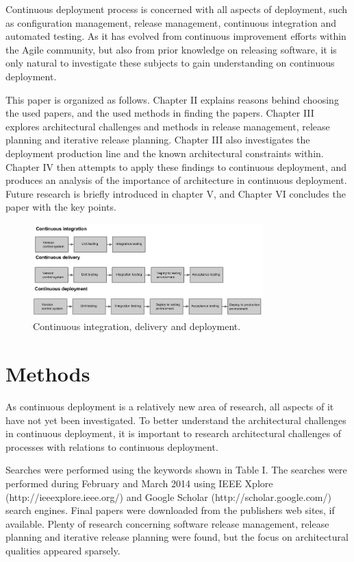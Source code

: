 \documentclass[conference]{IEEEtran}
\begin{document}
Continuous deployment process is concerned with all aspects of deployment, such as configuration management, release management, continuous integration and automated testing. As it has evolved from continuous improvement efforts within the Agile community, but also from prior knowledge on releasing software, it is only natural to investigate these subjects to gain understanding on continuous deployment.

This paper is organized as follows. Chapter II explains reasons behind choosing the used papers, and the used methods in finding the papers. Chapter III explores architectural challenges and methods in release management, release planning and iterative release planning. Chapter III also investigates the deployment production line and the known architectural constraints within. Chapter IV then attempts to apply these findings to continuous deployment, and produces an analysis of the importance of architecture in continuous deployment. Future research is briefly introduced in chapter V, and Chapter VI concludes the paper with the key points.  

\begin{figure}[!t]
	\centering
	\includegraphics[width=3.5in]{rtvd.jpg}
	\caption{Continuous integration, delivery and deployment.}
	\label{fig1}
\end{figure}

\section{Methods} %

As continuous deployment is a relatively new area of research, all aspects of it have not yet been investigated. To better understand the architectural challenges in continuous deployment, it is important to research architectural challenges of processes with relations to continuous deployment.

Searches were performed using the keywords shown in Table I. The searches were performed during February and March 2014 using IEEE Xplore (http://ieeexplore.ieee.org/‎) and Google Scholar (http://scholar.google.com/) search engines. Final papers were downloaded from the publishers web sites, if available. Plenty of research concerning software release management, release planning and iterative release planning were found, but the focus on architectural qualities appeared sparsely.  
\end{document}
